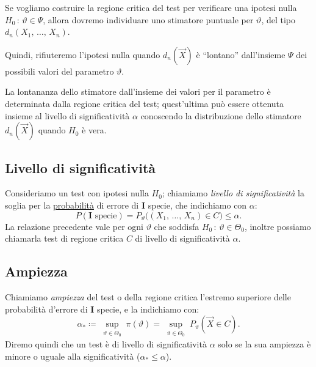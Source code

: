         \begin{obsv}
            Se vogliamo costruire la regione critica del test per verificare una ipotesi nulla 
            $H_0 \,:\, \vartheta \in \Psi$, allora dovremo individuare uno stimatore puntuale per 
            $\vartheta$, del tipo $d_n(X_1,\, \ldots,\, X_{n})$.

            Quindi, rifiuteremo l'ipotesi nulla quando $d_n(\vec{X})$ è ``lontano'' dall'insieme $\Psi$ dei 
            possibili valori del parametro $\vartheta$.

            La lontananza dello stimatore dall'insieme dei valori per il parametro è determinata dalla
            regione critica del test; quest'ultima può essere ottenuta insieme al livello di significatività 
            $\alpha$ conoscendo la distribuzione dello stimatore $d_n(\vec{X})$ quando $H_0$ è vera.
        \end{obsv}
        \subsection{Livello di significatività}
            \begin{defn}
                Consideriamo un test con ipotesi nulla $H_0$; chiamiamo \emph{livello di significatività} la 
                soglia per la \underline{probabilità} di errore di $\mathbf{I}$ specie, che indichiamo con $\alpha$: \[
                    P(\mathbf{I}\text{ specie}) 
                    = P_\vartheta\big((X_1,\, \ldots,\, X_{n}) \in C\big) \leq \alpha
                .\] La relazione precedente vale per ogni $\vartheta$ che soddisfa 
                $H_0\,:\, \vartheta \in \Theta_0$, inoltre possiamo chiamarla test di regione critica $C$ 
                di livello di significatività $\alpha$.
            \end{defn}
        \subsection{Ampiezza}
            \begin{defn}
                Chiamiamo \emph{ampiezza} del test o della regione critica l'estremo superiore delle 
                probabilità d'errore di $\mathbf{I}$ specie, e la indichiamo con: \[
                    \alpha_* \coloneqq \sup_{\substack{\vartheta \in \Theta_0}} \pi(\vartheta) 
                    = \sup_{\substack{\vartheta \in \Theta_0}} P_\vartheta(\vec{X} \in C)
                .\] Diremo quindi che un test è di livello di significatività $\alpha$ solo se la sua ampiezza 
                è minore o uguale alla significatività ($\alpha_* \leq \alpha$).
            \end{defn}
